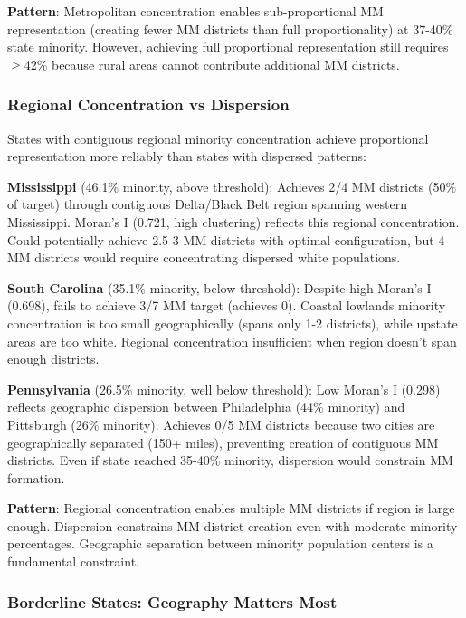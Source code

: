 \textbf{Pattern}: Metropolitan concentration enables sub-proportional MM representation (creating fewer MM districts than full proportionality) at 37-40\% state minority. However, achieving full proportional representation still requires $\geq$42\% because rural areas cannot contribute additional MM districts.

\subsubsection{Regional Concentration vs Dispersion}

States with contiguous regional minority concentration achieve proportional representation more reliably than states with dispersed patterns:

\textbf{Mississippi} (46.1\% minority, above threshold): Achieves 2/4 MM districts (50\% of target) through contiguous Delta/Black Belt region spanning western Mississippi. Moran's I (0.721, high clustering) reflects this regional concentration. Could potentially achieve 2.5-3 MM districts with optimal configuration, but 4 MM districts would require concentrating dispersed white populations.

\textbf{South Carolina} (35.1\% minority, below threshold): Despite high Moran's I (0.698), fails to achieve 3/7 MM target (achieves 0). Coastal lowlands minority concentration is too small geographically (spans only 1-2 districts), while upstate areas are too white. Regional concentration insufficient when region doesn't span enough districts.

\textbf{Pennsylvania} (26.5\% minority, well below threshold): Low Moran's I (0.298) reflects geographic dispersion between Philadelphia (44\% minority) and Pittsburgh (26\% minority). Achieves 0/5 MM districts because two cities are geographically separated (150+ miles), preventing creation of contiguous MM districts. Even if state reached 35-40\% minority, dispersion would constrain MM formation.

\textbf{Pattern}: Regional concentration enables multiple MM districts if region is large enough. Dispersion constrains MM district creation even with moderate minority percentages. Geographic separation between minority population centers is a fundamental constraint.

\subsubsection{Borderline States: Geography Matters Most}

